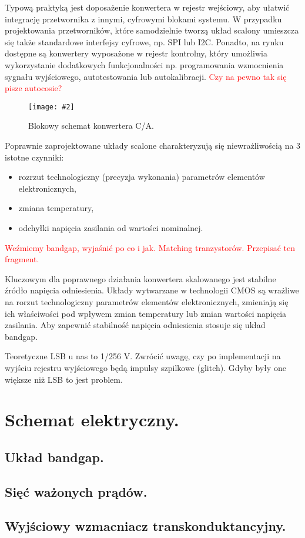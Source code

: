 \documentclass[10pt,a4paper]{report}
\newcommand{\img}[4]{
	\begin{figure}[H]
		\begin{center}
			\texttt{[image: \#2]}
			\caption{#3}
			\label{#4}
		\end{center}
	\end{figure}
}
\begin{document}
	{	Typową praktyką jest doposażenie konwertera w rejestr wejściowy, aby ułatwić integrację przetwornika z innymi, cyfrowymi blokami systemu. W przypadku projektowania przetworników, które samodzielnie tworzą układ scalony umieszcza się także standardowe interfejsy cyfrowe, np. SPI lub I2C. Ponadto, na rynku dostępne są konwertery wyposażone w rejestr kontrolny, który umożliwia wykorzystanie dodatkowych funkcjonalności np. programowania wzmocnienia sygnału wyjściowego, autotestowania lub autokalibracji. \textcolor{red}{Czy na pewno tak się pisze autocosie?}
		\img{20}{../visio/blokschkonca.pdf}{Blokowy schemat konwertera C/A.}{blokschkonca} }

	{	Poprawnie zaprojektowane układy scalone charakteryzują się niewrażliwością na 3 istotne czynniki:
		\begin{itemize}
			\item rozrzut technologiczny (precyzja wykonania) parametrów elementów elektronicznych,
			\item zmiana temperatury,
			\item odchyłki napięcia zasilania od wartości nominalnej.
		\end{itemize}
		\textcolor{red}{Weźmiemy bandgap, wyjaśnić po co i jak. Matching tranzystorów. Przepisać ten fragment.}	}
	
	{	Kluczowym dla poprawnego działania konwertera skalowanego jest stabilne źródło napięcia odniesienia. Układy wytwarzane w technologii CMOS są wrażliwe na rorzut technologiczny parametrów elementów elektronicznych, zmieniają się ich właściwości pod wpływem zmian temperatury lub zmian wartości napięcia zasilania. Aby zapewnić stabilność napięcia odniesienia stosuje się układ bandgap. }

	{	Teoretyczne LSB u nas to 1/256 V. Zwrócić uwagę, czy po implementacji na wyjściu rejestru wyjściowego będą impulsy szpilkowe (glitch). Gdyby były one większe niż LSB to jest problem.
		}
	\chapter{Schemat elektryczny.}
	\section{Układ bandgap.}
	\section{Sięć ważonych prądów.}
	\section{Wyjściowy wzmacniacz transkonduktancyjny.}
\end{document}
